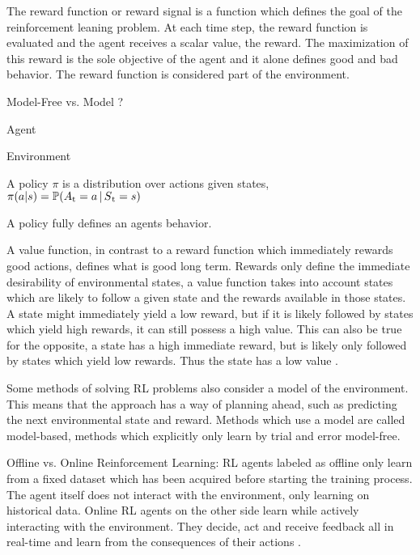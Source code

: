 The reward function or reward signal is a function which defines the goal of the reinforcement leaning problem.
At each time step, the reward function is evaluated and the agent receives a scalar value, the reward.
The maximization of this reward is the sole objective of the agent and it alone defines good and bad behavior.
The reward function is considered part of the environment.
\parencite{sutton2018reinforcement}



\parencite{weng2018bandit}
\parencite{sutton2018reinforcement}

Model-Free vs. Model ?

Agent

Environment

\begin{definition*}
	A policy $\pi$ is a distribution over actions given states,\\
	$\pi(a|s) = \mathbb{P}(A\textsubscript{t} = a\,|\,S\textsubscript{t} = s)$
\end{definition*}
A policy fully defines an agents behavior. 


A value function, in contrast to a reward function which immediately rewards good actions, defines what is good long term. 
Rewards only define the immediate desirability of environmental states, a value function takes into account states which are likely to follow a given state and the rewards available in those states.
A state might immediately yield a low reward, but if it is likely followed by states which yield high rewards, it can still possess a high value.
This can also be true for the opposite, a state has a high immediate reward, but is likely only followed by states which yield low rewards. Thus the state has a low value \parencite{sutton2018reinforcement}.

Some methods of solving RL problems also consider a model of the environment. This means that the approach has a way of planning ahead, such as predicting the next environmental state and reward.
Methods which use a model are called model-based, methods which explicitly only learn by trial and error model-free\parencite{sutton2018reinforcement}.

Offline vs. Online Reinforcement Learning: 
RL agents labeled as offline only learn from a fixed dataset which has been acquired before starting the training process.
The agent itself does not interact with the environment, only learning on historical data.
Online RL agents on the other side learn while actively interacting with the environment.
They decide, act and receive feedback all in real-time and learn from the consequences of their actions \parencite{schrittwieser2021online}.



